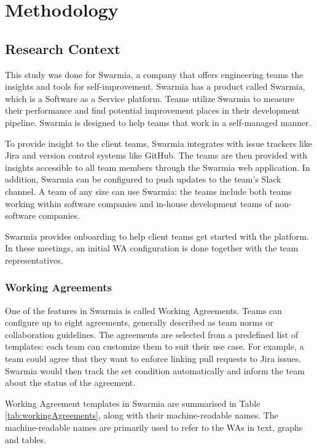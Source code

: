 \chapter{Methodology}

\section{Research Context}

This study was done for Swarmia, a company that offers engineering teams the insights and tools for self-improvement. Swarmia has a product called Swarmia, which is a Software as a Service platform. Teams utilize Swarmia to measure their performance and find potential improvement places in their development pipeline. Swarmia is designed to help teams that work in a self-managed manner.

To provide insight to the client teams, Swarmia integrates with issue trackers like Jira and version control systems like GitHub. The teams are then provided with insights accessible to all team members through the Swarmia web application. In addition, Swarmia can be configured to push updates to the team's Slack channel. A team of any size can use Swarmia: the teams include both teams working within software companies and in-house development teams of non-software companies.

Swarmia provides onboarding to help client teams get started with the platform. In these meetings, an initial WA configuration is done together with the team representatives. 

\subsection{Working Agreements}

One of the features in Swarmia is called Working Agreements. Teams can configure up to eight agreements, generally described as team norms or collaboration guidelines. The agreements are selected from a predefined list of templates: each team can customize them to suit their use case. For example, a team could agree that they want to enforce linking pull requests to Jira issues. Swarmia would then track the set condition automatically and inform the team about the status of the agreement. 



Working Agreement templates in Swarmia are summarised in Table \ref{tab:workingAgreements}, along with their machine-readable names. The machine-readable names are primarily used to refer to the WAs in text, graphs and tables.

